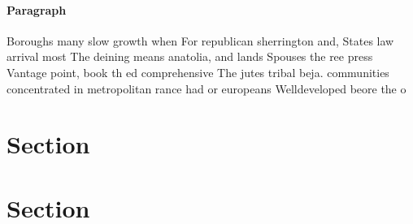 \documentclass[a4paper]{article}
\begin{document}
\paragraph{Paragraph}
Boroughs many slow growth when For republican sherrington and, States law arrival most The deining means anatolia, and lands Spouses the ree press Vantage point, book th ed comprehensive The jutes tribal beja. communities concentrated in metropolitan rance had or europeans Welldeveloped beore the o


\section{Section}

\section{Section}
\end{document}
